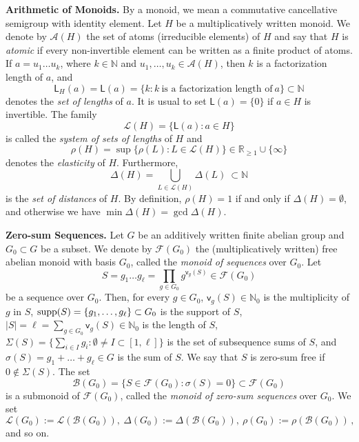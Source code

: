 \documentclass[a4paper,10pt]{amsart}
\theoremstyle{plain}
\theoremstyle{definition}
\newcommand{\N}{\mathbb N}
\newcommand{\R}{\mathbb R}
\numberwithin{equation}{section}
\begin{document}
\smallskip
\noindent
{\bf Arithmetic of Monoids.} By a monoid, we mean a commutative cancellative semigroup with identity element. Let $H$ be a multiplicatively written monoid. We denote by $\mathcal A (H)$ the set of atoms (irreducible elements) of $H$ and say that $H$ is {\it atomic} if every non-invertible element can be written as a finite product of atoms. If $a = u_1 \ldots u_k$, where $k \in \N$ and $u_1, \ldots, u_k \in \mathcal A (H)$, then $k$ is a factorization length of $a$, and
\[
\mathsf L_H (a) = \mathsf L (a) = \{k \colon k \ \text{is a factorization length of} \ a \} \subset \N
\]
denotes the {\it set of lengths} of $a$. It is usual to set $\mathsf L (a) = \{0\}$ if $a \in H$ is invertible. The family
\[
\mathcal L (H) = \{\mathsf L (a) \colon a \in H \}
\]
is called the {\it system of sets of lengths} of $H$ and
\[
\rho (H) = \sup \{ \rho (L) \colon L \in \mathcal L (H) \} \in \R_{\ge 1} \cup \{\infty\}
\]
denotes the {\it elasticity} of $H$. Furthermore,
\[
\Delta (H) = \bigcup_{L \in \mathcal L (H)} \Delta (L) \ \subset \N
\]
is the {\it set of distances} of $H$. By definition, $\rho (H)=1$ if and only if $\Delta (H)=\emptyset$, and otherwise we have $\min \Delta (H) = \gcd \Delta (H)$.

\smallskip
\noindent
{\bf Zero-sum Sequences.} Let $G$ be an additively written finite abelian group and $G_0 \subset G$ be a subset. We denote by
$\mathcal F (G_0)$ the (multiplicatively written) free abelian monoid with basis $G_0$, called the {\it monoid of sequences} over $G_0$.
Let
\[
S = g_1 \ldots g_{\ell} = \prod_{g \in G_0} g^{\mathsf v_g (S)} \in \mathcal F (G_0)
\]
be a sequence over $G_0$. Then, for every $g \in G_0$,  $\mathsf v_g (S) \in \N_0$ is the multiplicity of $g$ in $S$, $\operatorname{supp} (S) = \{g_1, \ldots, g_{\ell} \} \subset G_0$ is the support of $S$,  $|S|=\ell = \sum_{g \in G_0} \mathsf v_g (S) \in \N_0$ is the length of $S$, $\Sigma (S) = \{\sum_{i \in I} g_i \colon \emptyset \ne I \subset [1, \ell] \}$ is the set of subsequence sums of $S$, and $\sigma (S) = g_1+ \ldots + g_{\ell} \in G$ is the sum of $S$. We say that $S$ is zero-sum free if $0 \notin \Sigma (S)$. The set
\[
\mathcal B (G_0) = \{ S \in \mathcal F (G_0) \colon \sigma (S) = 0 \} \subset \mathcal F (G_0)
\]
is a submonoid of $\mathcal F (G_0)$, called the {\it monoid of zero-sum sequences} over $G_0$. We set
\[
\mathcal L (G_0) := \mathcal L ( \mathcal B (G_0)), \ \Delta (G_0) := \Delta ( \mathcal B (G_0)),  \ \rho (G_0) := \rho ( \mathcal B (G_0)) \,,
\]
and so on.
\end{document}
